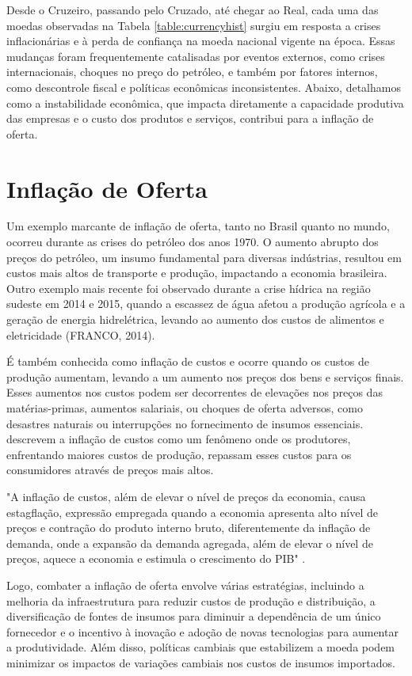 \documentclass[12pt,oneside,a4paper,chapter=TITLE,english,brazil,sumario=abnt-6027-2012]{abntex2}
\begin{document}
Desde o Cruzeiro, passando pelo Cruzado, até chegar ao Real, cada uma das moedas observadas na Tabela \ref{table:currencyhist} surgiu em resposta a crises inflacionárias e à perda de confiança na moeda nacional vigente na época. Essas mudanças foram frequentemente catalisadas por eventos externos, como crises internacionais, choques no preço do petróleo, e também por fatores internos, como descontrole fiscal e políticas econômicas inconsistentes. Abaixo, detalhamos como a instabilidade econômica, que impacta diretamente a capacidade produtiva das empresas e o custo dos produtos e serviços, contribui para a inflação de oferta.

\section{Inflação de Oferta}

Um exemplo marcante de inflação de oferta, tanto no Brasil quanto no mundo, ocorreu durante as crises do petróleo dos anos 1970. O aumento abrupto dos preços do petróleo, um insumo fundamental para diversas indústrias, resultou em custos mais altos de transporte e produção, impactando a economia brasileira. Outro exemplo mais recente foi observado durante a crise hídrica na região sudeste em 2014 e 2015, quando a escassez de água afetou a produção agrícola e a geração de energia hidrelétrica, levando ao aumento dos custos de alimentos e eletricidade (FRANCO, 2014).

É também conhecida como inflação de custos e ocorre quando os custos de produção aumentam, levando a um aumento nos preços dos bens e serviços finais. Esses aumentos nos custos podem ser decorrentes de elevações nos preços das matérias-primas, aumentos salariais, ou choques de oferta adversos, como desastres naturais ou interrupções no fornecimento de insumos essenciais.  descrevem a inflação de custos como um fenômeno onde os produtores, enfrentando maiores custos de produção, repassam esses custos para os consumidores através de preços mais altos.

"A inflação de custos, além de elevar o nível de preços da economia, causa estagflação, expressão empregada quando a economia apresenta alto nível de preços e contração do produto interno bruto, diferentemente da inflação de demanda, onde a expansão da demanda agregada, além de elevar o nível de preços, aquece a economia e estimula o crescimento do PIB" \cite{cortapasso_estagflacao}.

Logo, combater a inflação de oferta envolve várias estratégias, incluindo a melhoria da infraestrutura para reduzir custos de produção e distribuição, a diversificação de fontes de insumos para diminuir a dependência de um único fornecedor e o incentivo à inovação e adoção de novas tecnologias para aumentar a produtividade. Além disso, políticas cambiais que estabilizem a moeda podem minimizar os impactos de variações cambiais nos custos de insumos importados. 
\end{document}
